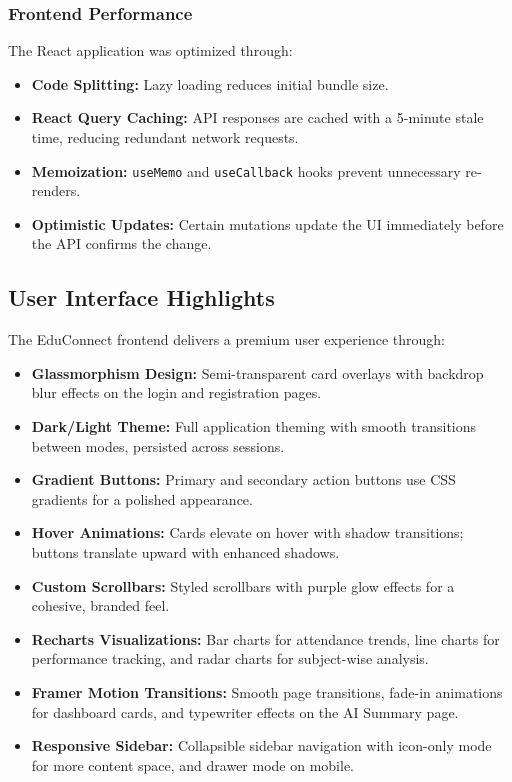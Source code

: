 \subsubsection{Frontend Performance}

The React application was optimized through:

\begin{itemize}[leftmargin=2em]
    \item \textbf{Code Splitting:} Lazy loading reduces initial bundle size.
    \item \textbf{React Query Caching:} API responses are cached with a 5-minute stale time, reducing redundant network requests.
    \item \textbf{Memoization:} \texttt{useMemo} and \texttt{useCallback} hooks prevent unnecessary re-renders.
    \item \textbf{Optimistic Updates:} Certain mutations update the UI immediately before the API confirms the change.
\end{itemize}

\subsection{User Interface Highlights}

The EduConnect frontend delivers a premium user experience through:

\begin{itemize}[leftmargin=2em]
    \item \textbf{Glassmorphism Design:} Semi-transparent card overlays with backdrop blur effects on the login and registration pages.
    \item \textbf{Dark/Light Theme:} Full application theming with smooth transitions between modes, persisted across sessions.
    \item \textbf{Gradient Buttons:} Primary and secondary action buttons use CSS gradients for a polished appearance.
    \item \textbf{Hover Animations:} Cards elevate on hover with shadow transitions; buttons translate upward with enhanced shadows.
    \item \textbf{Custom Scrollbars:} Styled scrollbars with purple glow effects for a cohesive, branded feel.
    \item \textbf{Recharts Visualizations:} Bar charts for attendance trends, line charts for performance tracking, and radar charts for subject-wise analysis.
    \item \textbf{Framer Motion Transitions:} Smooth page transitions, fade-in animations for dashboard cards, and typewriter effects on the AI Summary page.
    \item \textbf{Responsive Sidebar:} Collapsible sidebar navigation with icon-only mode for more content space, and drawer mode on mobile.
\end{itemize}

